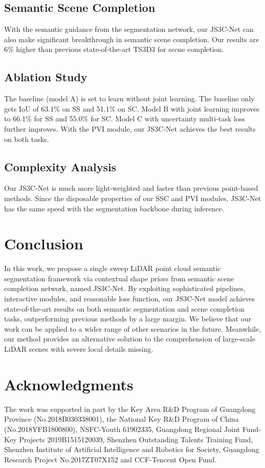 \documentclass[11pt,twocolumn]{article}
\begin{document}
\subsection{Semantic Scene Completion}
With the semantic guidance from the segmentation network, our JS3C-Net can also make significant breakthrough in semantic scene completion. Our results are 6\% higher than previous state-of-the-art TS3D3 for scene completion.

\subsection{Ablation Study}
The baseline (model A) is set to learn without joint learning. The baseline only gets IoU of 63.1\% on SS and 51.1\% on SC. Model B with joint learning improves to 66.1\% for SS and 55.0\% for SC. Model C with uncertainty multi-task loss further improves. With the PVI module, our JS3C-Net achieves the best results on both tasks.

\subsection{Complexity Analysis}
Our JS3C-Net is much more light-weighted and faster than previous point-based methods. Since the disposable properties of our SSC and PVI modules, JS3C-Net has the same speed with the segmentation backbone during inference.

\section{Conclusion}
\label{sec:conclusion}

In this work, we propose a single sweep LiDAR point cloud semantic segmentation framework via contextual shape priors from semantic scene completion network, named JS3C-Net. By exploiting sophisticated pipelines, interactive modules, and reasonable loss function, our JS3C-Net model achieves state-of-the-art results on both semantic segmentation and scene completion tasks, outperforming previous methods by a large margin. We believe that our work can be applied to a wider range of other scenarios in the future. Meanwhile, our method provides an alternative solution to the comprehension of large-scale LiDAR scenes with severe local details missing.

\section*{Acknowledgments}
The work was supported in part by the Key Area R\&D Program of Guangdong Province (No.2018B030338001), the National Key R\&D Program of China (No.2018YFB1800800), NSFC-Youth 61902335, Guangdong Regional Joint Fund-Key Projects 2019B1515120039, Shenzhen Outstanding Talents Training Fund, Shenzhen Institute of Artificial Intelligence and Robotics for Society, Guangdong Research Project No.2017ZT07X152 and CCF-Tencent Open Fund.



\end{document}
